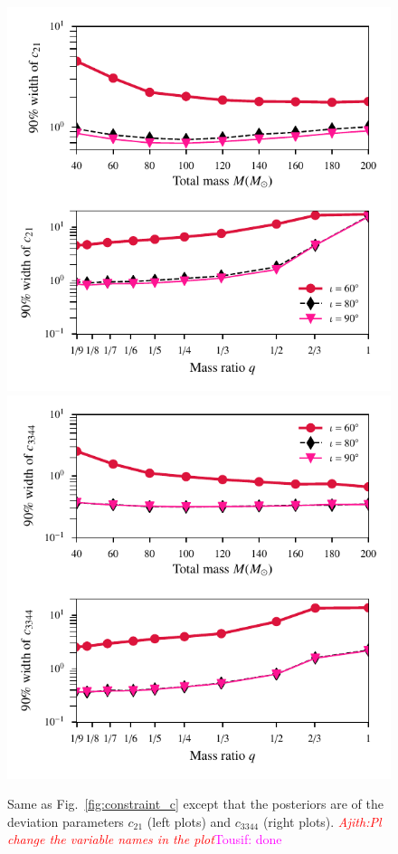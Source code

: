 \documentclass[prd,preprintnumbers,twocolumn,eqsecnum,floatfix,a4paper,nofootinbib,superscriptaddress]{revtex4}
\newcommand{\ajith}[1]{\textcolor{red}{\textit{Ajith:#1}}}
\newcommand{\tousif}[1]{\textcolor{magenta}{Tousif: #1}}
\begin{document}
\begin{figure}[tbh]
	\begin{center}
		\includegraphics[scale=0.75]{figs/90_percent_bounds_c2.pdf}
		\includegraphics[scale=0.75]{figs/90_percent_bounds_c34.pdf}
	\end{center}
	\caption{Same as Fig.~\ref{fig:constraint_c} except that the posteriors are of the deviation parameters $c_{21}$ (left plots) and  $c_{3344}$ (right plots). \ajith{Pl change the variable names in the plot}\tousif{done}}
	\label{fig:constraint_c21_c3344}
\end{figure}
\end{document}
